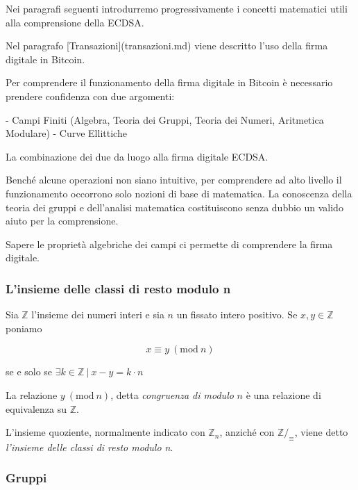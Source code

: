 \documentclass{book}
\theoremstyle{definition}
\newcommand{\Mod}[1]{\ (\mathrm{mod}\ #1)}
\newcommand{\per}{\cdot}
\begin{document}
Nei paragrafi seguenti introdurremo progressivamente i concetti matematici utili alla comprensione della ECDSA.

Nel paragrafo [Transazioni](transazioni.md) viene descritto l'uso della firma digitale in Bitcoin.

Per comprendere il funzionamento della firma digitale in Bitcoin è necessario prendere confidenza con due argomenti:

- Campi Finiti (Algebra, Teoria dei Gruppi, Teoria dei Numeri, Aritmetica Modulare)
- Curve Ellittiche

La combinazione dei due da luogo alla firma digitale ECDSA.

Benché alcune operazioni non siano intuitive, per comprendere ad alto livello il funzionamento occorrono solo nozioni di base di matematica.
La conoscenza della teoria dei gruppi e dell'analisi matematica costituiscono senza dubbio un valido aiuto per la comprensione.

Sapere le proprietà algebriche dei campi ci permette di comprendere la firma digitale.


\newpage
\subsubsection{L'insieme delle classi di resto modulo n}
Sia $\mathbb{Z}$ l'insieme dei numeri interi e sia $n$ un fissato intero positivo.
Se $x, y \in \mathbb{Z}$ poniamo

\[
x \equiv y \Mod{n}
\]

se e solo se $\exists k \in \mathbb{Z} \ | \ x - y = k \per n$

La relazione $y \Mod{n}$, detta \emph{congruenza di modulo} $n$ è una relazione di equivalenza su $\mathbb{Z}$.

L'insieme quoziente, normalmente indicato con $\mathbb{Z}_{n}$, anziché con $\mathbb{Z}/_{\equiv}$, viene detto \emph{l'insieme delle classi di resto modulo n}.

\subsubsection{Gruppi}
\end{document}
